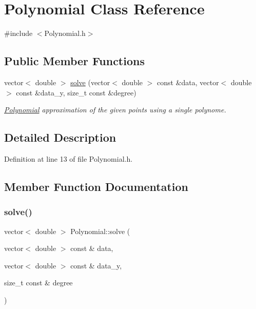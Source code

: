 \hypertarget{class_polynomial}{}\section{Polynomial Class Reference}
\label{class_polynomial}


{\ttfamily \#include $<$Polynomial.\+h$>$}

\subsection*{Public Member Functions}
\begin{DoxyCompactItemize}
\item 
vector$<$ double $>$ \mbox{\hyperlink{class_polynomial_ae67730df0a2e45a87c9cb244fe03ad6b}{solve}} (vector$<$ double $>$ const \&data, vector$<$ double $>$ const \&data\+\_\+y, size\+\_\+t const \&degree)
\begin{DoxyCompactList}\small\item\em \mbox{\hyperlink{class_polynomial}{Polynomial}} approximation of the given points using a single polynome. \end{DoxyCompactList}\end{DoxyCompactItemize}


\subsection{Detailed Description}


Definition at line 13 of file Polynomial.\+h.



\subsection{Member Function Documentation}
\mbox{\label{class_polynomial_ae67730df0a2e45a87c9cb244fe03ad6b}} 
\subsubsection{\texorpdfstring{solve()}{solve()}}
{\footnotesize\ttfamily vector$<$ double $>$ Polynomial\+::solve (\begin{DoxyParamCaption}\item[{vector$<$ double $>$ const \&}]{data,  }\item[{vector$<$ double $>$ const \&}]{data\+\_\+y,  }\item[{size\+\_\+t const \&}]{degree }\end{DoxyParamCaption})}



